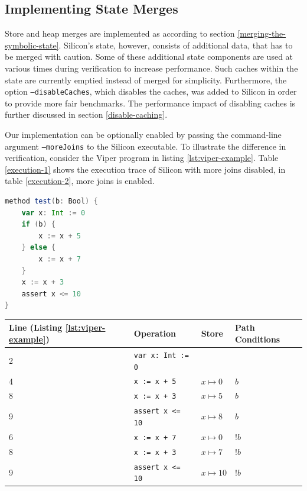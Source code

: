\documentclass[11pt]{article}
\begin{document}
    \subsection{Implementing State Merges} \label{implementing-state-merges}

    Store and heap merges are implemented as according to section \ref{merging-the-symbolic-state}.
    Silicon's state, however, consists of additional data, that has to be merged with caution.
    Some of these additional state components are used at various times during verification
    to increase performance.
    Such caches within the state are currently emptied instead of merged for simplicity.
    Furthermore, the option
    \texttt{--disableCaches}, which disables the caches,
    was added to Silicon in order to provide more fair benchmarks.
    The performance impact of disabling caches is further discussed in section \ref{disable-caching}.

    Our implementation can be optionally enabled by passing the command-line
    argument \texttt{--moreJoins} to the Silicon executable. To illustrate the difference
    in verification, consider the Viper program in listing \ref{lst:viper-example}.
    Table \ref{execution-1} shows the execution trace of Silicon with more joins disabled,
    in table \ref{execution-2}, more joins is enabled.

    \begin{lstlisting}[language=Scala, caption={An example Viper program.}, label={lst:viper-example}]
method test(b: Bool) {
    var x: Int := 0
    if (b) {
        x := x + 5
    } else {
        x := x + 7
    }
    x := x + 3
    assert x <= 10
}       
    \end{lstlisting}

    \begin{center}
        \begin{tabular}{ l|l|l|l }
            Line (Listing \ref{lst:viper-example}) & Operation & Store & Path Conditions \\
            \hline
            2 & \texttt{var x: Int := 0} & & \\
            4 & \texttt{x := x + 5} & $x \mapsto 0$ & $b$ \\
            8 & \texttt{x := x + 3} & $x \mapsto 5$ & $b$ \\
            9 & \texttt{assert x <= 10} & $x \mapsto 8$ & $b$ \\
            6 & \texttt{x := x + 7} & $x \mapsto 0$ & $!b$ \\
            8 & \texttt{x := x + 3} & $x \mapsto 7$ & $!b$ \\
            9 & \texttt{assert x <= 10} & $x \mapsto 10$ & $!b$ \\
        \end{tabular}
        \label{execution-1}
    \end{center}
\end{document}
